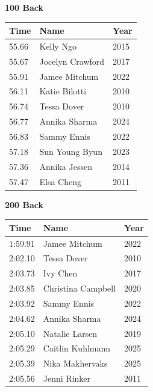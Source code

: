 \vspace{1.2em}
\noindent\begin{minipage}[t]{0.48\textwidth}
\centering
\textbf{\textcolor{teamprimary}{100 Back}}\par
\vspace{0.5em}
\centering
\small
\renewcommand{\arraystretch}{1.0}
\setlength{\tabcolsep}{4pt}
\begin{tabular}{@{}p{1.8cm}p{3.0cm}p{1.0cm}@{}}
\toprule
\textbf{Time} & \textbf{Name} & \textbf{Year} \\
\midrule
55.66 & Kelly Ngo & 2015 \\
55.67 & Jocelyn Crawford & 2017 \\
55.91 & Jamee Mitchum & 2022 \\
56.11 & Katie Bilotti & 2010 \\
56.74 & Tessa Dover & 2010 \\
56.77 & Annika Sharma & 2024 \\
56.83 & Sammy Ennis & 2022 \\
57.18 & Sun Young Byun & 2023 \\
57.36 & Annika Jessen & 2014 \\
57.47 & Elsa Cheng & 2011 \\
\bottomrule
\end{tabular}
\end{minipage}
\hfill
\begin{minipage}[t]{0.48\textwidth}
\centering
\textbf{\textcolor{teamprimary}{200 Back}}\par
\vspace{0.5em}
\centering
\small
\renewcommand{\arraystretch}{1.0}
\setlength{\tabcolsep}{4pt}
\begin{tabular}{@{}p{1.8cm}p{3.0cm}p{1.0cm}@{}}
\toprule
\textbf{Time} & \textbf{Name} & \textbf{Year} \\
\midrule
1:59.91 & Jamee Mitchum & 2022 \\
2:02.10 & Tessa Dover & 2010 \\
2:03.73 & Ivy Chen & 2017 \\
2:03.85 & Christina Campbell & 2020 \\
2:03.92 & Sammy Ennis & 2022 \\
2:04.62 & Annika Sharma & 2024 \\
2:05.10 & Natalie Larsen & 2019 \\
2:05.29 & Caitlin Kuhlmann & 2025 \\
2:05.39 & Nika Makhervaks & 2025 \\
2:05.56 & Jenni Rinker & 2011 \\
\bottomrule
\end{tabular}
\end{minipage}
